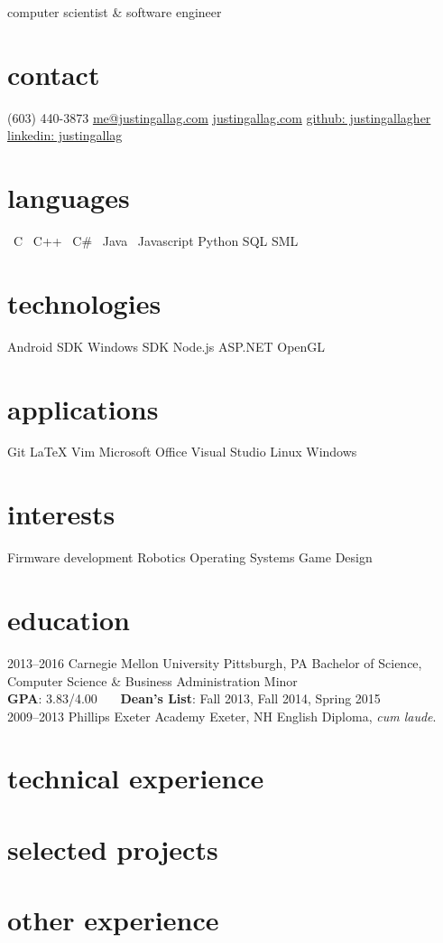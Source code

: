 \documentclass[]{friggeri-cv}
\newcommand{\starr}{\raisebox{0.2ex}{$\star $}}
\begin{document}
    {computer scientist \& software engineer}

    \begin{aside}
        \section{contact}
            (603) 440-3873
            \href{mailto:me@justingallag.com}{me@justingallag.com}
            \href{http://justingallag.com}{justingallag.com}
            \href{https://github.com/justingallagher}{github: justingallagher}
            \href{https://www.linkedin.com/in/justingallag}{linkedin: justingallag}
        \section{languages}
            \starr \ C
            \starr \ C++
            \starr \ C\#
            \starr \ Java
            \starr \ Javascript
            Python
            SQL
            SML
        \section{technologies}
            Android SDK
            Windows SDK
            Node.js
            ASP.NET
            OpenGL
        \section{applications}
            Git
            LaTeX
            Vim
            Microsoft Office
            Visual Studio
            Linux
            Windows
        \section{interests}
            Firmware development
            Robotics
            Operating Systems
            Game Design
    \end{aside}

    \section{education}

    \begin{entrylist}
        \entry
            {2013--2016}
            {Carnegie Mellon University}
            {Pittsburgh, PA}
            {Bachelor of Science, Computer Science \& Business Administration Minor\\
            \textbf{GPA}: 3.83/4.00 \ \ \ \textbf{Dean's List}: Fall 2013, Fall 2014, Spring 2015\\}
        \entry
            {2009--2013}
            {Phillips Exeter Academy}
            {Exeter, NH}
            {English Diploma, \emph{cum laude}.}
    \end{entrylist}

    \section{technical experience}

    \section{selected projects}
    \section{other experience}
\end{document}
